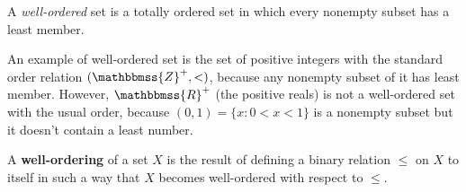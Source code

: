 \documentclass{article}
\begin{document}
A \emph{well-ordered} set is a totally ordered set in which every nonempty subset has a least member.

An example of well-ordered set is the set of positive integers with the standard order relation $(\mathbbmss{Z}^+,<)$, because any nonempty subset of it has least member. However,  $\mathbbmss{R}^+$ (the positive reals) is not a well-ordered set with the usual order, because $(0,1)=\{x:0<x<1\}$ is a nonempty subset but it doesn't contain a least number.

A \textbf{well-ordering} of a set $X$ is the result of defining a binary relation $\leq$ on $X$ to itself in such a way that $X$ becomes well-ordered with respect to $\leq$.
\end{document}
